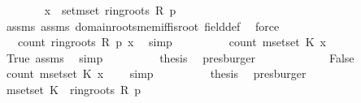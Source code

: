 \begin{isabellebody}
\ \ \ \ \ \ \isamarkupfalse%
\ {\isachardoublequoteopen}x\ {\isasymin}\ set{\isacharunderscore}{\kern0pt}mset\ {\isacharparenleft}{\kern0pt}ring{\isachardot}{\kern0pt}roots\ R\ p{\isacharparenright}{\kern0pt}{\isachardoublequoteclose}\isanewline
\ \ \ \ \ \ \ \ \isamarkupfalse%
\ assms{\isacharparenleft}{\kern0pt}{}{\isacharparenright}{\kern0pt}\ assms{\isacharparenleft}{\kern0pt}{}{\isacharparenright}{\kern0pt}\ domain{\isachardot}{\kern0pt}roots{\isacharunderscore}{\kern0pt}mem{\isacharunderscore}{\kern0pt}iff{\isacharunderscore}{\kern0pt}is{\isacharunderscore}{\kern0pt}root\ field{\isacharunderscore}{\kern0pt}def\ \isamarkupfalse%
\ force\isanewline
\ \ \ \ \ \ \isamarkupfalse%
\ {\isachardoublequoteopen}{}\ {\isasymle}\ count\ {\isacharparenleft}{\kern0pt}ring{\isachardot}{\kern0pt}roots\ R\ p{\isacharparenright}{\kern0pt}\ x{\isachardoublequoteclose}\ \isamarkupfalse%
\ simp\isanewline
\ \ \ \ \ \ \isamarkupfalse%
\ \isamarkupfalse%
\ {\isachardoublequoteopen}count\ {\isacharparenleft}{\kern0pt}mset{\isacharunderscore}{\kern0pt}set\ K{\isacharparenright}{\kern0pt}\ x\ {\isacharequal}{\kern0pt}\ {}{\isachardoublequoteclose}\ \isamarkupfalse%
\ True\ assms{\isacharparenleft}{\kern0pt}{}{\isacharparenright}{\kern0pt}\ \isamarkupfalse%
\ simp\isanewline
\ \ \ \ \ \ \isamarkupfalse%
\ \isamarkupfalse%
\ {\isacharquery}{\kern0pt}thesis\ \isamarkupfalse%
\ presburger\isanewline
\ \ \ \ \isamarkupfalse%
\isanewline
\ \ \ \ \ \ \isamarkupfalse%
\ False\isanewline
\ \ \ \ \ \ \isamarkupfalse%
\ {\isachardoublequoteopen}count\ {\isacharparenleft}{\kern0pt}mset{\isacharunderscore}{\kern0pt}set\ K{\isacharparenright}{\kern0pt}\ x\ {\isacharequal}{\kern0pt}\ {}{\isachardoublequoteclose}\ \isamarkupfalse%
\ simp\isanewline
\ \ \ \ \ \ \isamarkupfalse%
\ \isamarkupfalse%
\ {\isacharquery}{\kern0pt}thesis\ \isamarkupfalse%
\ presburger\isanewline
\ \ \ \ \isamarkupfalse%
\isanewline
\ \ \isamarkupfalse%
\isanewline
\ \ \isamarkupfalse%
\ {\isachardoublequoteopen}mset{\isacharunderscore}{\kern0pt}set\ K\ {\isasymsubseteq}{\isacharhash}{\kern0pt}\ ring{\isachardot}{\kern0pt}roots\ R\ p{\isachardoublequoteclose}\isanewline
\ \ \ \ \isamarkupfalse%

\end{isabellebody}

